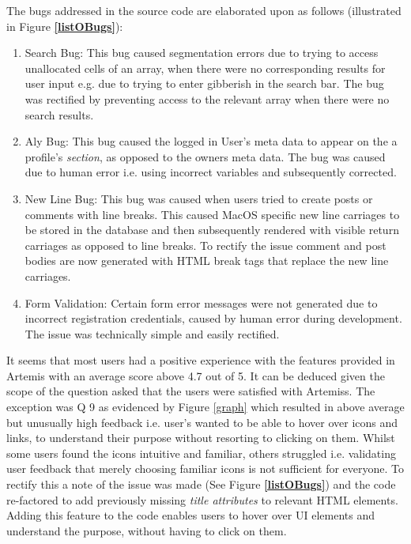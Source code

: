     The bugs addressed in the source code are elaborated upon as follows (illustrated in Figure \textbf{\ref{listOBugs}}):
    \begin{enumerate}
    
        \item Search Bug: This bug caused segmentation errors due to trying to access unallocated cells of an array, when there were no corresponding results for user input e.g. due to trying to enter gibberish in the search bar. The bug was rectified by preventing access to the relevant array when there were no search results.
        
        \item Aly Bug: This bug caused the logged in User's meta data to appear on the a profile's \textit{section}, as opposed to the owner\textquotesingle s meta data. The bug was caused due to human error i.e. using incorrect variables and subsequently corrected.
        
        \item New Line Bug: This bug was caused when user\textquotesingle s tried to create posts or comments with line breaks. This caused MacOS specific new line carriages to be stored in the database and then subsequently rendered with visible return carriages as opposed to line breaks. To rectify the issue comment and post bodies are now generated with HTML break tags that replace the new line carriages.
        
        \item Form Validation: Certain form error messages were not generated due to incorrect registration credentials, caused by human error during development. The issue was technically simple and easily rectified.
    
    \end{enumerate}
    
    It seems that most users had a positive experience with the features provided in Artemis with an average score above 4.7 out of 5. It can be deduced given the scope of the question asked that the users were satisfied with Artemis\textquotesingle s. The exception was Q 9 as evidenced by Figure \ref{graph} which resulted in above average but unusually high  feedback i.e. user's wanted to be able to hover over icons and links, to understand their purpose without resorting to clicking on them. Whilst some users found the icons intuitive and familiar, others struggled  i.e. validating user feedback that merely choosing familiar icons is not sufficient for everyone. To rectify this a note of the issue was made (See Figure \textbf{\ref{listOBugs}}) and the code re-factored to add previously missing \textit{title attributes} to relevant HTML elements. Adding this feature to the code enables users to hover over UI elements and understand the purpose, without having to click on them.
    
